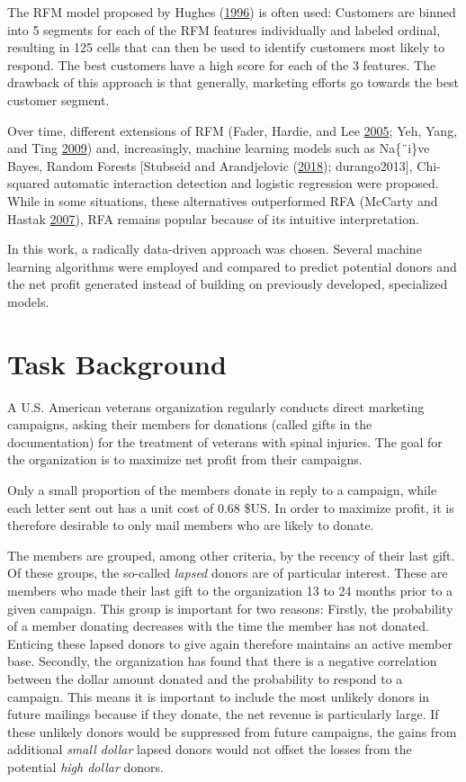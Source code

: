 \documentclass[
  11pt,
  a4paper,
  DIV=12,captions=tableheading,oneside,titlepage]{scrbook}
\begin{document}
The RFM model proposed by Hughes (\protect\hyperlink{ref-hughes-rfm-boost-response}{1996}) is often used: Customers are binned into 5 segments for each of the RFM features individually and labeled ordinal, resulting in 125 cells that can then be used to identify customers most likely to respond. The best customers have a high score for each of the 3 features. The drawback of this approach is that generally, marketing efforts go towards the best customer segment.

Over time, different extensions of RFM (Fader, Hardie, and Lee \protect\hyperlink{ref-fader2005rfmclv}{2005}; Yeh, Yang, and Ting \protect\hyperlink{ref-yeh2009}{2009}) and, increasingly, machine learning models such as Na\{¨i\}ve Bayes, Random Forests {[}Stubseid and Arandjelovic (\protect\hyperlink{ref-stubseid2018}{2018}); durango2013{]}, Chi-squared automatic interaction detection and logistic regression were proposed. While in some situations, these alternatives outperformed RFA (McCarty and Hastak \protect\hyperlink{ref-MCCARTY2007656}{2007}), RFA remains popular because of its intuitive interpretation.

In this work, a radically data-driven approach was chosen. Several machine learning algorithms were employed and compared to predict potential donors and the net profit generated instead of building on previously developed, specialized models.

\hypertarget{task-background}{%
\section{Task Background}\label{task-background}}

A U.S. American veterans organization regularly conducts direct marketing campaigns, asking their members for donations (called gifts in the documentation) for the treatment of veterans with spinal injuries. The goal for the organization is to maximize net profit from their campaigns.

Only a small proportion of the members donate in reply to a campaign, while each letter sent out has a unit cost of 0.68 \$US. In order to maximize profit, it is therefore desirable to only mail members who are likely to donate.

The members are grouped, among other criteria, by the recency of their last gift. Of these groups, the so-called \emph{lapsed} donors are of particular interest. These are members who made their last gift to the organization 13 to 24 months prior to a given campaign. This group is important for two reasons: Firstly, the probability of a member donating decreases with the time the member has not donated. Enticing these lapsed donors to give again therefore maintains an active member base. Secondly, the organization has found that there is a negative correlation between the dollar amount donated and the probability to respond to a campaign. This means it is important to include the most unlikely donors in future mailings because if they donate, the net revenue is particularly large. If these unlikely donors would be suppressed from future campaigns, the gains from additional \emph{small dollar} lapsed donors would not offset the losses from the potential \emph{high dollar} donors.
\end{document}
